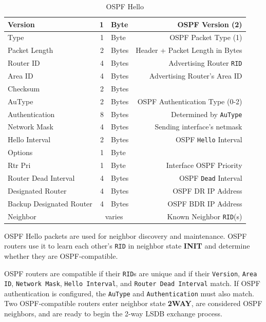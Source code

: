 \documentclass[12pt]{article}
\newcommand{\mc}[3]{\multicolumn{#1}{#2}{#3}}
\begin{document}
	\begin{table}[H]
	\centering
	\caption{OSPF Hello \label{tab:OSPF HELLO}}
	\begin{tabular}{| l | r @{ } l | r |}\hline
	Version				& 1	& Byte		& OSPF Version (2)\\\hline
	Type					& 1	& Byte		& OSPF Packet Type (1)\\\hline
	Packet Length			& 2	& Bytes		& Header + Packet Length in Bytes\\\hline
	Router ID				& 4	& Bytes		& Advertising Router \texttt{RID}\\\hline
	Area ID				& 4	& Bytes		& Advertising Router's Area ID\\\hline
	Checksum				& 2	& Bytes		&\\\hline
	AuType				& 2	& Bytes		& OSPF Authentication Type (0-2)\\\hline
	Authentication			& 8	& Bytes		& Determined by \texttt{AuType}\\\hline
	Network Mask			& 4	& Bytes		& Sending interface's netmask\\\hline
	Hello Interval			& 2	& Bytes		& OSPF \texttt{Hello} Interval\\\hline
	Options				& 1	& Byte		&\\\hline
	Rtr Pri				& 1	& Byte		& Interface OSPF Priority\\\hline
	Router Dead Interval		& 4	& Bytes		& OSPF \texttt{Dead} Interval\\\hline
	Designated Router		& 4	& Bytes		& OSPF DR IP Address\\\hline
	Backup Designated Router	& 4	& Bytes		& OSPF BDR IP Address\\\hline
	Neighbor				& \mc{2}{c|}{varies}	& Known Neighbor \texttt{RID}(s)\\\hline
	\end{tabular}\end{table}
	OSPF Hello packets are used for neighbor discovery and maintenance. OSPF routers use it to learn each other's \texttt{RID} in neighbor state \textbf{INIT} and determine whether they are OSPF-compatible.
	
	OSPF routers are compatible if their \texttt{RID}s are unique and if their \texttt{Version}, \texttt{Area ID}, \texttt{Network Mask}, \texttt{Hello Interval}, and \texttt{Router Dead Interval} match. If OSPF authentication is configured, the \texttt{AuType} and \texttt{Authentication} must also match. Two OSPF-compatible routers enter neighbor state \textbf{2WAY}, are considered OSPF neighbors, and are ready to begin the 2-way LSDB exchange process.
	
\end{document}
